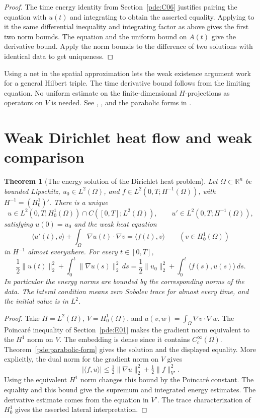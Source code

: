 \documentclass[11pt,oneside,openany]{book}
\theoremstyle{plain}
\newtheorem{theorem}{Theorem}[chapter]
\theoremstyle{definition}
\theoremstyle{remark}
\begin{document}
\begin{proof}
The time energy identity from Section~\ref{pde:C06} justifies
pairing the equation with \(u(t)\) and integrating to obtain the
asserted equality. Applying to it the same differential inequality
and integrating factor as above gives the first two norm bounds.
The equation and the uniform bound on \(A(t)\) give the derivative
bound. Apply the norm bounds to the difference of two solutions
with identical data to get uniqueness.
\end{proof}

Using a net in the spatial approximation lets the weak existence
argument work for a general Hilbert triple. The time derivative
bound follows from the limiting equation. No uniform estimate on
the finite-dimensional \(H\)-projections as operators on \(V\)
is needed. See \cite[\S 7.1.2]{Evans},
\cite[\S\S 11.1.1--11.1.2]{RR}, and the parabolic forms in \cite{D16}.

\section{Weak Dirichlet heat flow and weak comparison}
\label{pde:H06}

\begin{theorem}[The energy solution of the Dirichlet heat problem]
\label{pde:heat-dirichlet-weak}
Let \(\Omega\subset\mathbb R^n\) be bounded Lipschitz,
\(u_0\in L^2(\Omega)\), and
\(f\in L^2(0,T;H^{-1}(\Omega))\), with
\(H^{-1}=(H^1_0)'\).
There is a unique
\[
 u\in L^2(0,T;H^1_0(\Omega))\cap C([0,T];L^2(\Omega)),\qquad
 u'\in L^2(0,T;H^{-1}(\Omega)),
\]
satisfying \(u(0)=u_0\) and the weak heat equation
\[
 \langle u'(t),v\rangle+
      \int_\Omega\nabla u(t)\cdot\nabla v
          =\langle f(t),v\rangle
 \qquad(v\in H^1_0(\Omega))
\]
in \(H^{-1}\) almost everywhere. For every \(t\in[0,T]\),
\[
 \frac12\|u(t)\|_2^2+\int_0^t\|\nabla u(s)\|_2^2\,ds
 =\frac12\|u_0\|_2^2+\int_0^t\langle f(s),u(s)\rangle\,ds .
\]
In particular the energy norms are bounded by the corresponding
norms of the data. The lateral condition means zero Sobolev trace
for almost every time, and the initial value is in \(L^2\).
\end{theorem}

\begin{proof}
Take \(H=L^2(\Omega)\), \(V=H^1_0(\Omega)\), and
\(a(v,w)=\int_\Omega\nabla v\cdot\nabla w\).
The Poincar\'e inequality of Section~\ref{pde:E01} makes the
gradient norm equivalent to the \(H^1\) norm on \(V\).
The embedding is dense since it contains \(C_c^\infty(\Omega)\).
Theorem~\ref{pde:parabolic-form} gives the solution and the
displayed equality. More explicitly, the dual norm for the
gradient norm on \(V\) gives
\[
 |\langle f,u\rangle|
     \leq \tfrac12\|\nabla u\|_2^2
                       +\tfrac12\|f\|_{V'}^2.
\]
Using the equivalent \(H^1\) norm changes this bound by the
Poincar\'e constant. The equality and this bound give the
supremum and integrated energy estimates. The derivative estimate
comes from the equation in \(V'\).
The trace characterization of \(H^1_0\) gives the asserted
lateral interpretation.
\end{proof}
\end{document}
